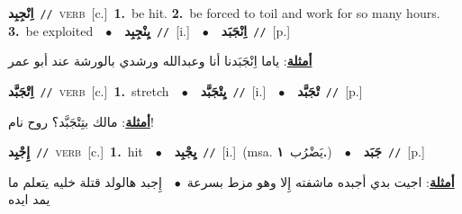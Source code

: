 \documentclass[10pt,a4paper,twoside]{article} %
\begin{document}
\begin{multicols}{2}
{{\setlength\topsep{0pt}\textbf{\foreignlanguage{arabic}{اِنْجِبِد}}\ {\color{gray}\texttt{//}\color{black}}\ \textsc{verb}\ [c.]\ \textbf{1.}~be hit.  \textbf{2.}~be forced to toil and work for so many hours.  \textbf{3.}~be exploited\ \ $\bullet$\ \ \setlength\topsep{0pt}\textbf{\foreignlanguage{arabic}{يِنْجِبِد}}\ {\color{gray}\texttt{//}\color{black}}\ [i.]\ \ $\bullet$\ \ \setlength\topsep{0pt}\textbf{\foreignlanguage{arabic}{اِنْجَبَد}}\ {\color{gray}\texttt{//}\color{black}}\ [p.]\  \begin{flushright}\color{gray}\foreignlanguage{arabic}{\textbf{\underline{\foreignlanguage{arabic}{أمثلة}}}: ياما اِنْجَبَدنا أنا وعبدالله ورشدي بالورشة عند أبو عمر}\end{flushright}\color{black}} \vspace{2mm}

{\setlength\topsep{0pt}\textbf{\foreignlanguage{arabic}{اِتْجَبَّد}}\ {\color{gray}\texttt{//}\color{black}}\ \textsc{verb}\ [c.]\ \textbf{1.}~stretch\ \ $\bullet$\ \ \setlength\topsep{0pt}\textbf{\foreignlanguage{arabic}{يِتْجَبَّد}}\ {\color{gray}\texttt{//}\color{black}}\ [i.]\ \ $\bullet$\ \ \setlength\topsep{0pt}\textbf{\foreignlanguage{arabic}{تْجَبَّد}}\ {\color{gray}\texttt{//}\color{black}}\ [p.]\  \begin{flushright}\color{gray}\foreignlanguage{arabic}{\textbf{\underline{\foreignlanguage{arabic}{أمثلة}}}: مالك بتِتْجَبَّد؟ روح نام!}\end{flushright}\color{black}} \vspace{2mm}

{\setlength\topsep{0pt}\textbf{\foreignlanguage{arabic}{إِجْبِد}}\ {\color{gray}\texttt{//}\color{black}}\ \textsc{verb}\ [c.]\ \textbf{1.}~hit\ \ $\bullet$\ \ \setlength\topsep{0pt}\textbf{\foreignlanguage{arabic}{يِجْبِد}}\ {\color{gray}\texttt{//}\color{black}}\ [i.]\ \color{gray}(msa. \foreignlanguage{arabic}{يَضْرُب}~\foreignlanguage{arabic}{\textbf{١.}})\color{black}\ \ $\bullet$\ \ \setlength\topsep{0pt}\textbf{\foreignlanguage{arabic}{جَبَد}}\ {\color{gray}\texttt{//}\color{black}}\ [p.]\  \begin{flushright}\color{gray}\foreignlanguage{arabic}{\textbf{\underline{\foreignlanguage{arabic}{أمثلة}}}: اجيت بدي أجبده ماشفته إِلا وهو مزط بسرعة\ $\bullet$\ \  إِجبد هالولد قتلة خليه يتعلم ما يمد ايده}\end{flushright}\color{black}} \vspace{2mm}

}
\end{multicols}
\end{document}
